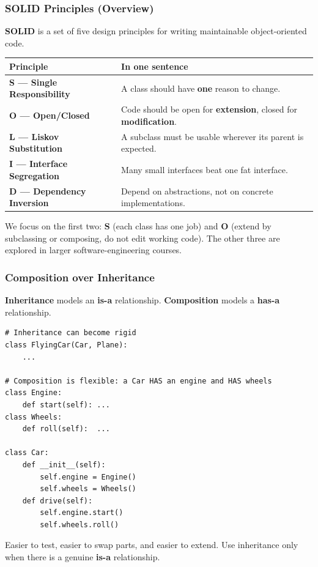 \documentclass[aspectratio=169,10pt]{beamer}
\newcommand{\keyword}[1]{\textcolor{PrimaryBlue}{\textbf{#1}}}
\begin{document}
\begin{frame}[fragile]
\frametitle{SOLID Principles (Overview)}
\small
\keyword{SOLID} is a set of five design principles for writing maintainable object-oriented code.

\vspace{0.15cm}
\renewcommand{\arraystretch}{1.30}
\begin{tabularx}{\linewidth}{>{\bfseries}p{4.4cm}X}
\toprule
Principle & In one sentence \\
\midrule
S --- Single Responsibility & A class should have \keyword{one} reason to change. \\
O --- Open/Closed           & Code should be open for \keyword{extension}, closed for \keyword{modification}. \\
L --- Liskov Substitution   & A subclass must be usable wherever its parent is expected. \\
I --- Interface Segregation & Many small interfaces beat one fat interface. \\
D --- Dependency Inversion  & Depend on abstractions, not on concrete implementations. \\
\bottomrule
\end{tabularx}

\vspace{0.18cm}
\begin{tcolorbox}[lecturebox,title=Today's focus]
We focus on the first two: \keyword{S} (each class has one job) and \keyword{O} (extend by subclassing or composing, do not edit working code). The other three are explored in larger software-engineering courses.
\end{tcolorbox}
\end{frame}


\begin{frame}[fragile]
\frametitle{Composition over Inheritance}
\small
\keyword{Inheritance} models an \keyword{is-a} relationship. \keyword{Composition} models a \keyword{has-a} relationship.

\vspace{0.12cm}
\begin{lstlisting}[style=pycode]
# Inheritance can become rigid
class FlyingCar(Car, Plane):
    ...

# Composition is flexible: a Car HAS an engine and HAS wheels
class Engine:
    def start(self): ...
class Wheels:
    def roll(self):  ...

class Car:
    def __init__(self):
        self.engine = Engine()
        self.wheels = Wheels()
    def drive(self):
        self.engine.start()
        self.wheels.roll()
\end{lstlisting}

\begin{tcolorbox}[lecturebox,title=Why prefer composition]
Easier to test, easier to swap parts, and easier to extend. Use inheritance only when there is a genuine \keyword{is-a} relationship.
\end{tcolorbox}
\end{frame}
\end{document}
